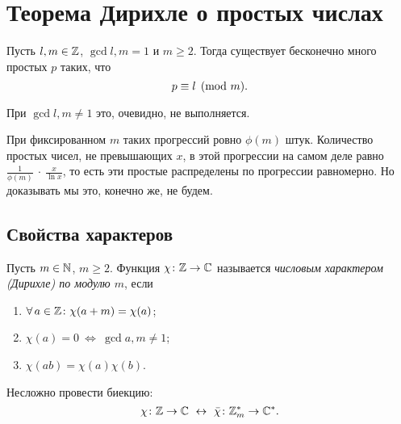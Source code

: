 \section{Теорема Дирихле о простых числах}
\label{sec:II_Dirichlet-theorem}


\begin{ntheorem}
\label{thm:II-1}
    Пусть $l,m \in \mathbb{Z}$, $\gcd{l, m} = 1$ и $m \ge 2$. Тогда существует бесконечно много простых $p$ таких, что 
    \[
        p \equiv l \pmod m.
    \]
\end{ntheorem}

\begin{remark}
    При $\gcd{l, m} \ne 1$ это, очевидно, не выполняется.
\end{remark}

\begin{remark}
    При фиксированном $m$ таких прогрессий ровно $\phi(m)$ штук. Количество простых чисел, не превышающих $x$, в этой прогрессии на самом деле равно $\frac{1}{\phi(m)}~\cdot~\frac{x}{\ln{x}}$, то есть эти простые распределены по прогрессии равномерно. Но доказывать мы это, конечно же, не будем.
\end{remark}


\subsection{Свойства характеров}
\label{subsec:II-1}

\begin{ndefinition}
\label{def:II_Dirichlet-character}
    Пусть $m \in \mathbb{N}$, $m \ge 2$. Функция $\chi\colon \mathbb{Z} \to \mathbb{C}$ называется \emph{числовым характером (Дирихле) по модулю $m$}, если
    \begin{enumerate}
        \item 
            $\forall a \in \ZZ\colon \chi(a+m) = \chi(a)$;
        \item 
            $\chi(a) = 0 \ \Leftrightarrow \ \gcd{a, m} \ne 1$;
        \item 
            $\chi(ab) = \chi(a)\chi(b)$.
    \end{enumerate}
\end{ndefinition}

\begin{remark}
    Несложно провести биекцию:
    \[
        \chi\colon \ZZ \to \CC 
        \ \leftrightarrow \ 
        \bar{\chi}\colon \ZZ_{m}^{\ast} \to \CC^{\ast}.
    \]
\end{remark}

